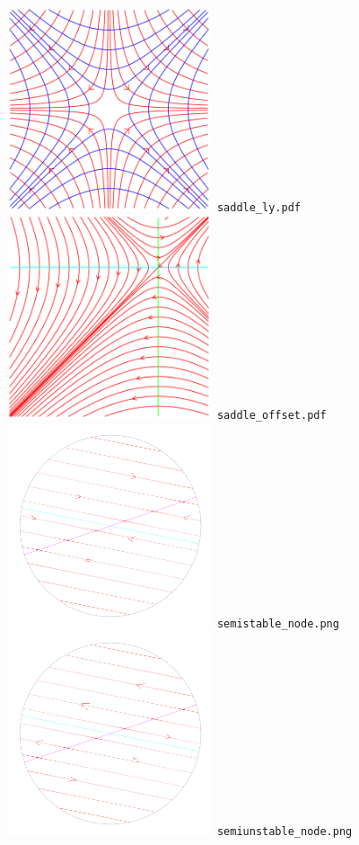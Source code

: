 \documentclass[a4paper]{amsart}
\begin{document}
\includegraphics[width=6cm]{saddle_ly.pdf}\verb+ saddle_ly.pdf+\\
\includegraphics[width=6cm]{saddle_offset.pdf}\verb+ saddle_offset.pdf+\\
\includegraphics[width=6cm]{semistable_node.png}\verb+ semistable_node.png+\\
\includegraphics[width=6cm]{semiunstable_node.png}\verb+ semiunstable_node.png+\\
\end{document}
